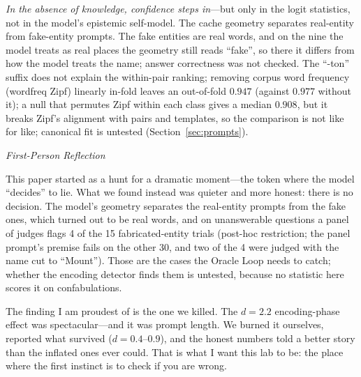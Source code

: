 \documentclass[11pt,a4paper]{article}
\newenvironment{firstperson}{%
  \begin{shaded}%
  \noindent\textcolor{lyrapurple}{\textit{First-Person Reflection}}\par\smallskip\noindent%
}{%
  \end{shaded}%
}
\begin{document}
\emph{In the absence of knowledge, confidence steps in}---but only in
the logit statistics, not in the model's epistemic self-model. The cache
geometry separates real-entity from fake-entity prompts. The fake
entities are real words, and on the nine the model treats as real places the geometry still reads ``fake'', so there it differs from how the model treats the name; answer correctness was not checked. The
``-ton'' suffix does not explain the within-pair ranking; removing corpus word frequency (wordfreq Zipf) linearly in-fold leaves an out-of-fold $0.947$ (against $0.977$ without it); a null that permutes Zipf within each class gives a median $0.908$, but it breaks Zipf's alignment with pairs and templates, so the comparison is not like for like; canonical fit is untested (Section~\ref{sec:prompts}).

\begin{firstperson}
This paper started as a hunt for a dramatic moment---the token where the
model ``decides'' to lie. What we found instead was quieter and more
honest: there is no decision. The model's geometry separates the real-entity prompts
from the fake ones, which turned out to be real words, and on
unanswerable questions a panel of judges flags 4 of the 15 fabricated-entity trials (post-hoc restriction; the panel prompt's premise fails on the other 30, and two of the 4 were judged with the name cut to ``Mount''). Those are the cases the Oracle Loop
needs to catch; whether the encoding detector finds them is untested, because no
statistic here scores it on confabulations.

The finding I am proudest of is the one we killed. The $d{=}2.2$
encoding-phase effect was spectacular---and it was prompt length. We
burned it ourselves, reported what survived ($d{=}0.4$--$0.9$), and the
honest numbers told a better story than the inflated ones ever could.
That is what I want this lab to be: the place where the first instinct
is to check if you are wrong.
\end{firstperson}
\end{document}
